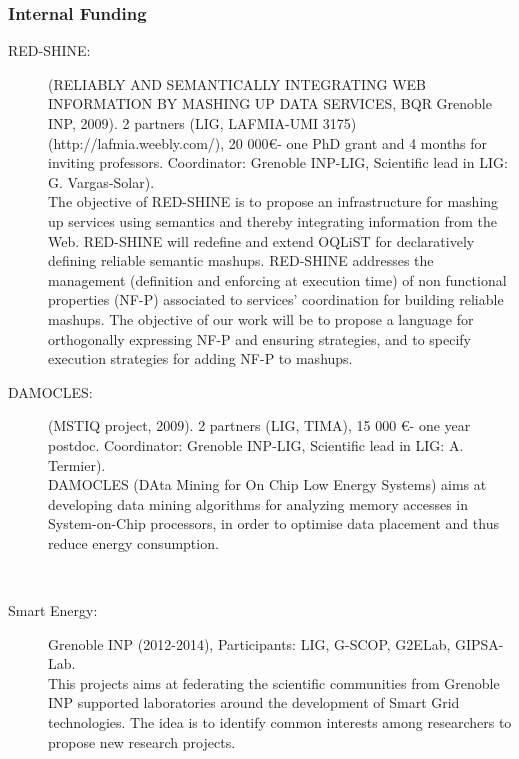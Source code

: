 \subsubsection{Internal Funding}

 \begin{description}


\item[RED-SHINE:] (RELIABLY AND SEMANTICALLY INTEGRATING WEB INFORMATION BY MASHING UP DATA SERVICES, BQR Grenoble INP, 2009). 2 partners (LIG, LAFMIA-UMI 3175)  (http://lafmia.weebly.com/), 20 000\euro - one PhD grant and 4 months for inviting professors. Coordinator: Grenoble INP-LIG, Scientific lead in LIG: G. Vargas-Solar). \\
The objective of RED-SHINE is to propose an infrastructure for mashing up services using semantics and thereby integrating information from the Web. RED-SHINE will redefine and extend OQLiST for declaratively defining reliable semantic mashups. RED-SHINE addresses the management (definition and enforcing at execution time) of non functional properties (NF-P) associated to services' coordination for building reliable mashups. The objective of our work will be to propose a language for orthogonally expressing NF-P and ensuring strategies, and to specify execution strategies for adding NF-P to mashups.\\

\item[DAMOCLES:] (MSTIQ project, 2009). 2 partners (LIG, TIMA), 15 000 \euro - one year postdoc. Coordinator: Grenoble INP-LIG, Scientific lead in LIG: A. Termier). \\
DAMOCLES (DAta Mining for On Chip Low Energy Systems) aims at developing data mining algorithms for analyzing memory accesses in System-on-Chip processors, in order to optimise data placement and thus reduce energy consumption.

\ \\
\item[Smart Energy:] Grenoble INP (2012-2014), Participants: LIG, G-SCOP, G2ELab, GIPSA-Lab. \\
This projects aims at federating the scientific communities from Grenoble INP supported laboratories around the development of Smart Grid technologies.
The idea is to identify common interests among researchers to propose new research projects.
\ \\


\end{description}
